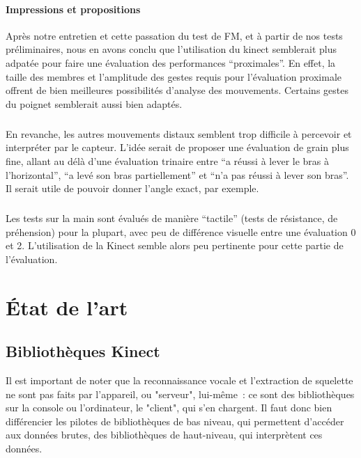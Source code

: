 \documentclass[french,12pt]{report}
\begin{document}
	\subsubsection{Impressions et propositions}
Après notre entretien et cette passation du test de FM, et à partir de nos tests préliminaires, nous en avons 
conclu que l'utilisation du kinect semblerait plus adpatée pour faire une évaluation des performances “proximales”.
En effet, la taille des membres et l'amplitude des gestes requis pour l'évaluation proximale offrent de bien 
meilleures possibilités d'analyse des mouvements. Certains gestes du poignet semblerait aussi bien adaptés.
\paragraph{}En revanche, les autres mouvements distaux semblent trop difficile à percevoir et interpréter par le capteur.
L’idée serait de proposer une évaluation de grain plus fine, allant au délà d’une évaluation trinaire entre 
“a réussi à lever le bras à l’horizontal”, “a levé son bras partiellement” et “n’a pas réussi à lever son bras”. 
Il serait utile de pouvoir donner l’angle exact, par exemple.   

\paragraph{}Les tests sur la main sont évalués de manière “tactile” (tests de résistance, de préhension) pour la plupart, 
avec peu de différence visuelle entre une évaluation 0 et 2. L’utilisation de la Kinect semble alors peu pertinente
pour cette partie de l’évaluation.
		
	\chapter{État de l'art}
	
	
  \section{Bibliothèques Kinect}
		
Il est important de noter que la reconnaissance vocale et l'extraction de 
squelette ne sont pas faits par l'appareil, ou "serveur", lui-même~: ce sont des
bibliothèques sur la console ou l'ordinateur, le "client", qui s'en chargent. 
Il faut donc bien
différencier les pilotes de bibliothèques de bas niveau, qui permettent 
d'accéder aux données brutes, des
bibliothèques de haut-niveau, qui interprètent ces données.
\end{document}
